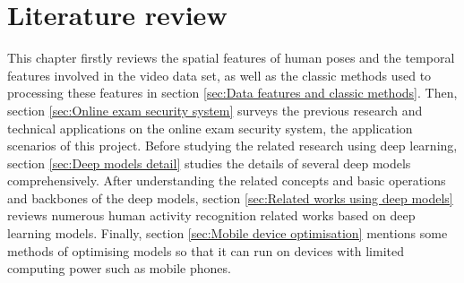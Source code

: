 \chapter{Literature review}
\label{chap:Literature review}
This chapter firstly reviews the spatial features of human poses and the temporal features involved in the video data set, as well as the classic methods used to processing these features in section \ref{sec:Data features and classic methods}.
Then, section \ref{sec:Online exam security system} surveys the previous research and technical applications on the online exam security system, the application scenarios of this project.
Before studying the related research using deep learning, section \ref{sec:Deep models detail} studies the details of several deep models comprehensively.
After understanding the related concepts and basic operations and backbones of the deep models, section \ref{sec:Related works using deep models} reviews numerous human activity recognition related works based on deep learning models.
Finally, section \ref{sec:Mobile device optimisation} mentions some methods of optimising models so that it can run on devices with limited computing power such as mobile phones.
